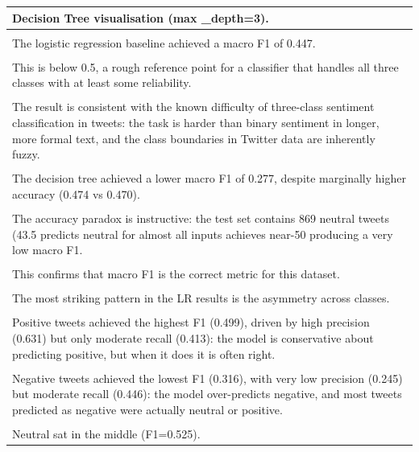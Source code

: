 \documentclass[11pt]{article}
\begin{document}
\begin{longtable}{|p{\dimexpr\linewidth-2\tabcolsep-2\arrayrulewidth\relax}|}
\hline
Decision Tree visualisation (max \_depth=3). \\[2pt]
\hline
\rule{0pt}{3.5cm} \\
\hline
The logistic regression baseline achieved a macro F1 of 0.447. \\[2pt]
\hline
\rule{0pt}{3.5cm} \\
\hline
This is below 0.5, a rough reference point for a classifier that handles all three classes with at least some reliability. \\[2pt]
\hline
\rule{0pt}{3.5cm} \\
\hline
The result is consistent with the known difficulty of three-class sentiment classification in tweets: the task is harder than binary sentiment in longer, more formal text, and the class boundaries in Twitter data are inherently fuzzy. \\[2pt]
\hline
\rule{0pt}{3.5cm} \\
\hline
The decision tree achieved a lower macro F1 of 0.277, despite marginally higher accuracy (0.474 vs 0.470). \\[2pt]
\hline
\rule{0pt}{3.5cm} \\
\hline
The accuracy paradox is instructive: the test set contains 869 neutral tweets (43.5 predicts neutral for almost all inputs achieves near-50 producing a very low macro F1. \\[2pt]
\hline
\rule{0pt}{3.5cm} \\
\hline
This confirms that macro F1 is the correct metric for this dataset. \\[2pt]
\hline
\rule{0pt}{3.5cm} \\
\hline
The most striking pattern in the LR results is the asymmetry across classes. \\[2pt]
\hline
\rule{0pt}{3.5cm} \\
\hline
Positive tweets achieved the highest F1 (0.499), driven by high precision (0.631) but only moderate recall (0.413): the model is conservative about predicting positive, but when it does it is often right. \\[2pt]
\hline
\rule{0pt}{3.5cm} \\
\hline
Negative tweets achieved the lowest F1 (0.316), with very low precision (0.245) but moderate recall (0.446): the model over-predicts negative, and most tweets predicted as negative were actually neutral or positive. \\[2pt]
\hline
\rule{0pt}{3.5cm} \\
\hline
Neutral sat in the middle (F1=0.525). \\[2pt]

\end{longtable}
\end{document}

